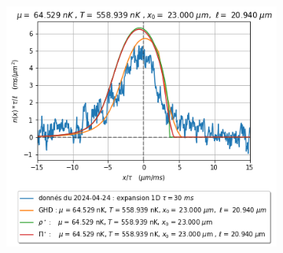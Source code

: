 \documentclass[a3, 10pt,twoside]{article}          %
\theoremstyle{plain}
\theoremstyle{definition}
\theoremstyle{remark}
\theoremstyle{definition} %
\begin{document}
\begin{figure}[H]
\begin{subfigure}[b]{0.32\textwidth}
        \caption{}
        \label{fig:expansion_1_expansion}
    \end{subfigure}
    \hfill
    \begin{subfigure}[b]{0.32\textwidth}
        \centering
        \includegraphics[width=\textwidth]{Figures/simul_expansion_30_expansion_23}
        \caption{}
        \label{}
    \end{subfigure}
    
    \vspace{1em}
    

\end{figure}
\end{document}
